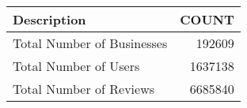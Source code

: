 \begin{tabular}{lr}
\toprule
                Description &    COUNT \\
\midrule
 Total Number of Businesses &   192609 \\
      Total Number of Users &  1637138 \\
    Total Number of Reviews &  6685840 \\
\bottomrule
\end{tabular}
